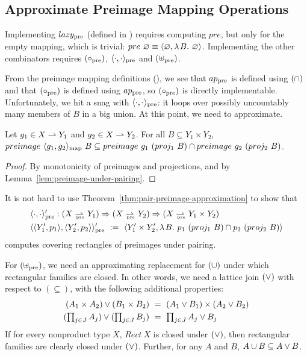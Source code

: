 \subsection{Approximate Preimage Mapping Operations}

Implementing $lazy_\mathrm{pre}$ (defined in ) requires computing $pre$, but only for the empty mapping, which is trivial: $pre~\varnothing \equiv \langle{\varnothing,\lambda\mspace{2mu}{B}\ldotp\,\varnothing}\rangle$.
Implementing the other combinators requires $(\circ_\mathrm{pre})$, $\langle{\cdot,\cdot}\rangle_\mathrm{pre}$ and $(\uplus_\mathrm{pre})$.

From the preimage mapping definitions (), we see that $ap_\mathrm{pre}$ is defined using $(\cap)$ and that $(\circ_\mathrm{pre})$ is defined using $ap_\mathrm{pre}$, so $(\circ_\mathrm{pre})$ is directly implementable.
Unfortunately, we hit a snag with $\langle{\cdot,\cdot}\rangle_\mathrm{pre}$: it loops over possibly uncountably many members of $B$ in a big union.
At this point, we need to approximate.

\begin{theorem}
\label{thm:pair-preimage-approximation}
Let $g_1 \in X \rightharpoonup Y_1$ and $g_2 \in X \rightharpoonup Y_2$.
For all $B \subseteq Y_1 \times Y_2$, $preimage~\langle{g_1,g_2}\rangle_\mathrm{map}~B \subseteq preimage~g_1~(proj_1~B) \cap preimage~g_2~(proj_2~B)$.%
\end{theorem}
\begin{proof}
By monotonicity of preimages and projections, and by Lemma~\ref{lem:preimage-under-pairing}.
\end{proof}

It is not hard to use Theorem~\ref{thm:pair-preimage-approximation} to show that
\begin{equation}
\begin{aligned}
	&\pair{\cdot,\cdot}\pre' : (X \prepto Y_1) \tto (X \prepto Y_2) \tto (X \prepto Y_1 \times Y_2) \\
	&\pair{\pair{Y_1',p_1},\pair{Y_2',p_2}}\pre' \ := \
		\pair{Y_1' \times Y_2',\fun{B}{p_1~(proj_1~B) \i p_2~(proj_2~B)}}
\end{aligned}
\end{equation}
computes covering rectangles of preimages under pairing.

For $(\uplus_\mathrm{pre})$, we need an approximating replacement for $(\cup)$ under which rectangular families are closed.
In other words, we need a lattice join $(\vee)$ with respect to $(\subseteq)$, with the following additional properties:
\begin{equation}
\begin{aligned}
	(A_1 \times A_2) \vee (B_1 \times B_2) &\ = \ (A_1 \vee B_1) \times (A_2 \vee B_2) \\
	(\textstyle\prod_{j \in J} A_j) \vee (\textstyle\prod_{j \in J} B_j) &\ = \ \textstyle\prod_{j \in J} A_j \vee B_j
\label{eqn:join-laws}
\end{aligned}
\end{equation}
If for every nonproduct type $X$, $Rect~X$ is closed under $(\vee)$, then rectangular families are clearly closed under $(\vee)$. Further, for any $A$ and $B$, $A \cup B \subseteq A \vee B$.

